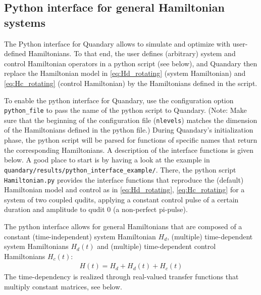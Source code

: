 \documentclass[11pt]{article}
\begin{document}
\subsection{Python interface for general Hamiltonian systems}
The Python interface for Quandary allows to simulate and optimize with user-defined Hamiltonians. To that end, the user defines (arbitrary) system and control Hamiltonian operators in a python script (see below), and Quandary then replace the Hamiltonian model in \eqref{eq:Hd_rotating} (system Hamiltonian) and \eqref{eq:Hc_rotating} (control Hamiltonian) by the Hamiltonians defined in the script. 

To enable the python interface for Quandary, use the configuration option \texttt{python\_file} to pass the name of the python script to Quandary. (Note: Make sure that the beginning of the configuration file (\texttt{nlevels}) matches the dimension of the Hamiltonians defined in the python file.)
During Quandary's initialization phase, the python script will be parsed for functions of specific names that return the corresponding Hamiltonians. A description of the interface functions is given below. A good place to start is by having a look at the example in \texttt{quandary/results/python\_interface\_example/}. There, the python script \texttt{Hamiltonian.py} provides the interface functions that reproduce the (default) Hamiltonian model and control as in \eqref{eq:Hd_rotating}, \eqref{eq:Hc_rotating} for a system of two coupled qudits, applying a constant control pulse of a certain duration and amplitude to qudit 0 (a non-perfect pi-pulse).

The python interface allows for general Hamiltonians that are composed of a constant (time-independent) system Hamiltonian $H_{d}$, (multiple) time-dependent system Hamiltonians $H_{d}(t)$ and (multiple) time-dependent control Hamiltonians $H_{c}(t)$: 
\begin{align}
    H(t) = H_{d} + H_{d}(t) + H_{c}(t) 
\end{align}
The time-dependency is realized through real-valued transfer functions that multiply constant matrices, see below. 
\end{document}
